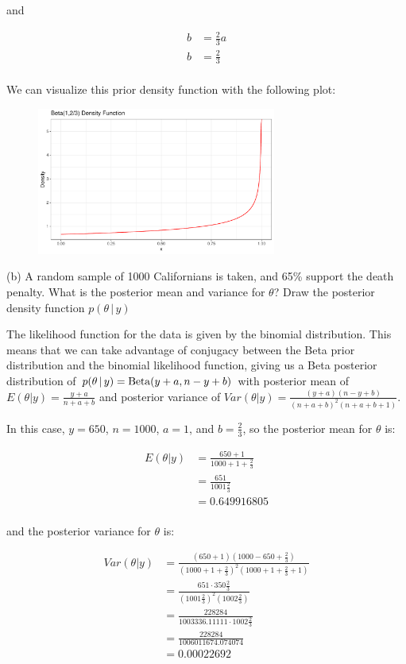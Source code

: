 \documentclass[12pt]{article}
\begin{document}
and

\begin{align*}
b &= \frac{2}{3}a \\
b &= \frac{2}{3} \\
\end{align*}

We can visualize this prior density function with the following plot:

\begin{figure}[h]
    \centering
    \includegraphics[width=0.7\textwidth]{q3a_plot.pdf}
\end{figure}

(b) A random sample of 1000 Californians is taken, and 65\% support the death penalty.  What is the posterior mean and variance for $\theta$? Draw the posterior density function $p(\theta \, | \, y)$

The likelihood function for the data is given by the binomial distribution. This means that we can take advantage of 
conjugacy between the Beta prior distribution and the binomial likelihood function, giving us a Beta posterior distribution 
of $p(\theta \, | \, y) = {\rm Beta}(y + a, n - y + b)$ with posterior mean of $E(\theta | y) = \frac{y + a}{n + a + b}$ and
posterior variance of $Var(\theta | y) = \frac{(y + a)(n - y + b)}{(n + a + b)^2(n + a + b + 1)}$.

In this case, $y = 650$, $n = 1000$, $a = 1$, and $b = \frac{2}{3}$, so the posterior mean for $\theta$ is:

\begin{align*}
E(\theta | y) &= \frac{650 + 1}{1000 + 1 + \frac{2}{3}} \\
&= \frac{651}{1001\frac{2}{3}} \\
&= 0.649916805 \\
\end{align*}

and the posterior variance for $\theta$ is:

\begin{align*}
Var(\theta | y) &= \frac{(650 + 1)(1000 - 650 + \frac{2}{3})}{(1000 + 1 + \frac{2}{3})^2(1000 + 1 + \frac{2}{3} + 1)} \\
&= \frac{651 \cdot 350\frac{2}{3}}{(1001\frac{2}{3})^2(1002\frac{2}{3})} \\
&= \frac{228284}{1003336.11111 \cdot 1002\frac{2}{3}} \\
&= \frac{228284}{1006011674.074074} \\
&= 0.00022692 \\
\end{align*}
\end{document}
